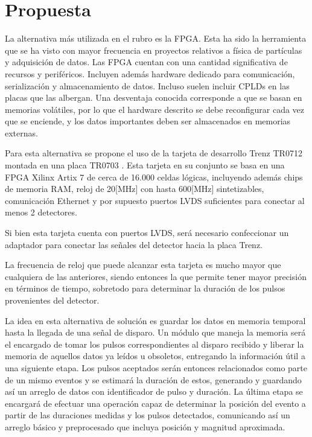 \newpage
\section{Propuesta}
	La alternativa más utilizada en el rubro es la FPGA. Esta ha sido la herramienta que se ha visto con mayor frecuencia en proyectos relativos a física de partículas y adquisición de datos. 
	Las FPGA cuentan con una cantidad significativa de recursos y periféricos. Incluyen además hardware dedicado para comunicación, serialización y almacenamiento de datos. Incluso suelen incluir CPLDs en las placas que las albergan. Una desventaja conocida corresponde a que se basan en memorias volátiles, por lo que el hardware descrito se debe reconfigurar cada vez que se enciende, y los datos importantes deben ser almacenados en memorias externas.
	
	Para esta alternativa se propone el uso de la tarjeta de desarrollo Trenz TR0712 \cite{TrenzElectronic2019TR07012Wiki} montada en una placa TR0703 \cite{TrenzElectronic2019TR0703Wiki}. Esta tarjeta en su conjunto se basa en una FPGA Xilinx Artix 7 \cite{Xilinx20107DS180} de cerca de 16.000 celdas lógicas, incluyendo además chips de memoria RAM, reloj de 20[MHz] con hasta 600[MHz] sintetizables, comunicación Ethernet y por supuesto puertos LVDS suficientes para conectar al menos 2 detectores.
	
	Si bien esta tarjeta cuenta con puertos LVDS, será necesario confeccionar un adaptador para conectar las señales del detector hacia la placa Trenz.
	
	La frecuencia de reloj que puede alcanzar esta tarjeta es mucho mayor que cualquiera de las anteriores, siendo entonces la que permite tener mayor precisión en términos de tiempo, sobretodo para determinar la duración de los pulsos provenientes del detector.
	
	La idea en esta alternativa de solución es guardar los datos en memoria temporal hasta la llegada de una señal de disparo. Un módulo que maneja la memoria será el encargado de tomar los pulsos correspondientes al disparo recibido y liberar la memoria de aquellos datos ya leídos u obsoletos, entregando la información útil a una siguiente etapa. Los pulsos aceptados serán entonces relacionados como parte de un mismo eventos y se estimará la duración de estos, generando y guardando así un arreglo de datos con identificador de pulso y duración. La última etapa se encargará de efectuar una operación capaz de determinar la posición del evento a partir de las duraciones medidas y los pulsos detectados, comunicando así un arreglo básico y preprocesado que incluya posición y magnitud aproximada.
	
